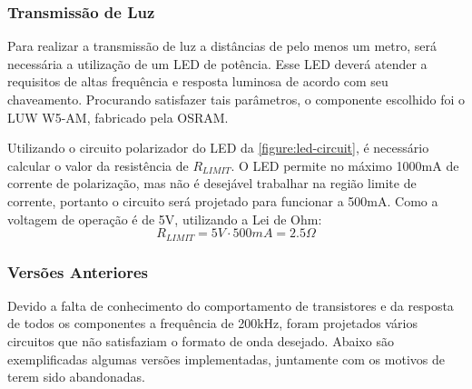 	\subsubsection{Transmissão de Luz}
		
	Para realizar a transmissão de luz a distâncias de pelo menos um metro, será necessária a utilização de um LED de potência. Esse LED deverá atender a requisitos de altas frequência e resposta luminosa de acordo com seu chaveamento. Procurando satisfazer tais parâmetros, o componente escolhido foi o LUW W5-AM, fabricado pela OSRAM.

	Utilizando o circuito polarizador do LED da \autoref{figure:led-circuit}, é necessário calcular o valor da resistência de $R_{LIMIT}$. O LED permite no máximo 1000mA de corrente de polarização, mas não é desejável trabalhar na região limite de corrente, portanto o circuito será projetado para funcionar a 500mA. Como a voltagem de operação é de 5V, utilizando a Lei de Ohm:
	\begin{equation}
	R_{LIMIT} = 5V \cdot 500mA = 2.5\Omega
	\end{equation}
	
	\subsubsection{Versões Anteriores}
	
	Devido a falta de conhecimento do comportamento de transistores e da resposta de todos os componentes a frequência de 200kHz, foram projetados vários circuitos que não satisfaziam o formato de onda desejado. Abaixo são exemplificadas algumas versões implementadas, juntamente com os motivos de terem sido abandonadas.
	
